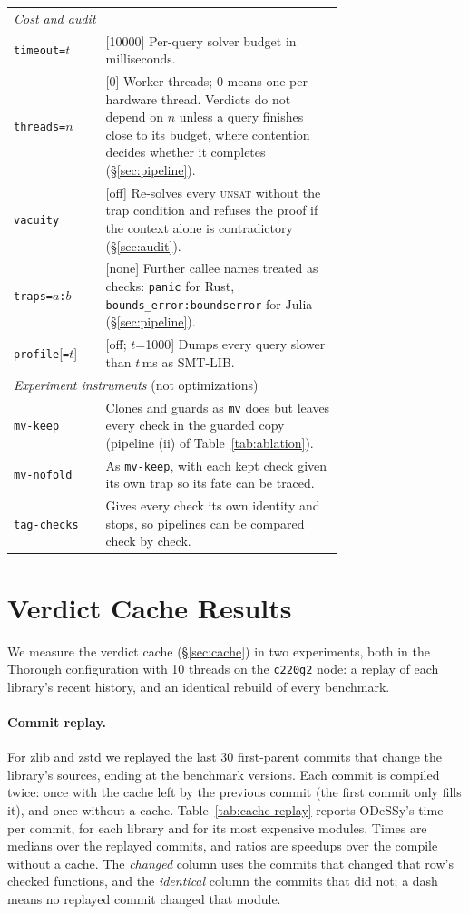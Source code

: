 \documentclass[acmsmall,screen,nonacm]{acmart}
\newcommand{\odessy}{ODeSSy}
\newcommand{\tool}{\odessy}
\begin{document}
\begin{table}[h]
{\begin{tabular}{lp{0.72\linewidth}}
\midrule
\multicolumn{2}{l}{\emph{Cost and audit}}\\
\texttt{timeout=}$t$ & [10000] Per-query solver budget in milliseconds.\\
\texttt{threads=}$n$ & [0] Worker threads; 0 means one per hardware thread. Verdicts do not depend on $n$
unless a query finishes close to its budget, where contention decides whether it completes (\S\ref{sec:pipeline}).\\
\texttt{vacuity} & [off] Re-solves every \textsc{unsat} without the trap condition and refuses
the proof if the context alone is contradictory (\S\ref{sec:audit}).\\
\texttt{traps=}$a$\texttt{:}$b$ & [none] Further callee names treated as checks: \texttt{panic}
for Rust, \texttt{bounds\_error:boundserror} for Julia (\S\ref{sec:pipeline}).\\
\texttt{profile}[\texttt{=}$t$] & [off; $t$=1000] Dumps every query slower than $t$\,ms as SMT-LIB.\\
\midrule
\multicolumn{2}{l}{\emph{Experiment instruments} (not optimizations)}\\
\texttt{mv-keep} & Clones and guards as \texttt{mv} does but leaves every check in the guarded
copy (pipeline (ii) of Table~\ref{tab:ablation}).\\
\texttt{mv-nofold} & As \texttt{mv-keep}, with each kept check given its own trap so its fate
can be traced.\\
\texttt{tag-checks} & Gives every check its own identity and stops, so pipelines can be
compared check by check.\\
\bottomrule
\end{tabular}}
\end{table}

\section{Verdict Cache Results}
\label{sec:app-cache}
We measure the verdict cache (\S\ref{sec:cache}) in two experiments,
both in the Thorough configuration with 10 threads on the \texttt{c220g2}
node: a replay of each library's recent history, and an identical rebuild
of every benchmark.

\paragraph{Commit replay.} For zlib and zstd we replayed the last 30
first-parent commits that change the library's sources, ending at the
benchmark versions. Each commit is compiled twice: once with the cache left
by the previous commit (the first commit only fills it), and once without a
cache. Table~\ref{tab:cache-replay} reports \tool{}'s time per commit, for
each library and for its most expensive modules. Times are medians over the
replayed commits, and ratios are speedups over the compile without a cache.
The \emph{changed} column uses the commits that changed that row's checked
functions, and the \emph{identical} column the commits that did not; a dash
means no replayed commit changed that module.
\end{document}

